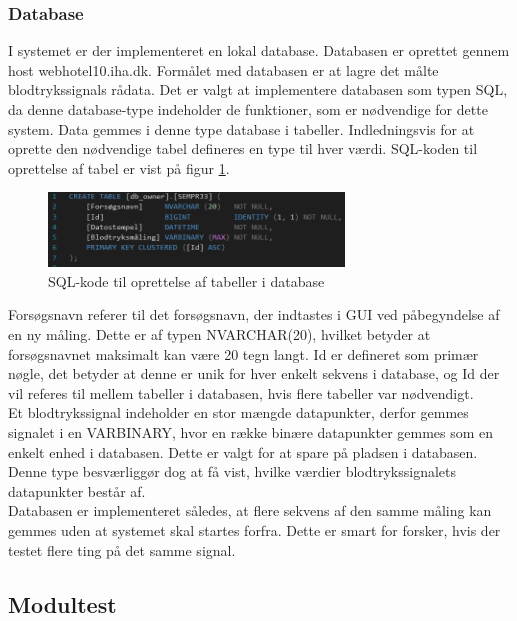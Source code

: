 \subsubsection{Database}
I systemet er der implementeret en lokal database. Databasen er oprettet gennem host webhotel10.iha.dk. Formålet med databasen er at lagre det målte blodtrykssignals rådata. Det er valgt at implementere databasen som typen SQL, da denne database-type indeholder de funktioner, som er nødvendige for dette system. Data gemmes i denne type database i tabeller. Indledningsvis for at oprette den nødvendige tabel defineres en type til hver værdi. SQL-koden til oprettelse af tabel er vist på figur \ref{fig:SQL-kode}.
\begin{figure}[H]
	\centering
	\includegraphics[width=0.7\textwidth]{Figurer/SQLDatabase}
	\caption{SQL-kode til oprettelse af tabeller i database}
	\label{fig:SQL-kode}
\end{figure}
Forsøgsnavn referer til det forsøgsnavn, der indtastes i GUI ved påbegyndelse af en ny måling. Dette er af typen NVARCHAR(20), hvilket betyder at forsøgsnavnet maksimalt kan være 20 tegn langt. Id er defineret som primær nøgle, det betyder at denne er unik for hver enkelt sekvens i database, og Id der vil referes til mellem tabeller i databasen, hvis flere tabeller var nødvendigt. \\  
Et blodtrykssignal indeholder en stor mængde datapunkter, derfor gemmes signalet i en VARBINARY, hvor en række binære datapunkter gemmes som en enkelt enhed i databasen. Dette er valgt for at spare på pladsen i databasen. Denne type besværliggør dog at få vist, hvilke værdier blodtrykssignalets datapunkter består af. \\
Databasen er implementeret således, at flere sekvens af den samme måling kan gemmes uden at systemet skal startes forfra. Dette er smart for forsker, hvis der testet flere ting på det samme signal.  

\subsection{Modultest}
